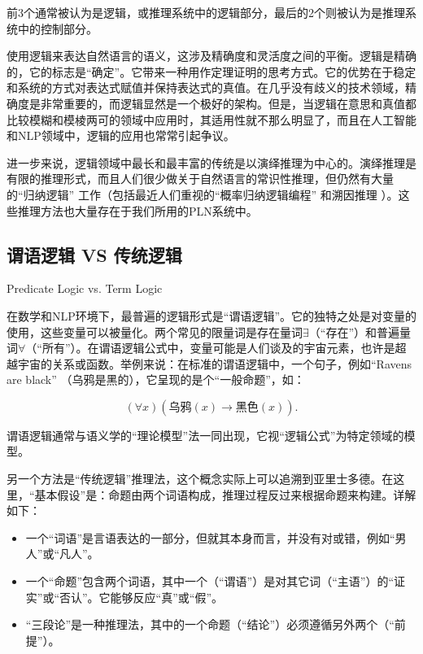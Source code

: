 \noindent 前3个通常被认为是逻辑，或推理系统中的逻辑部分，最后的2个则被认为是推理系统中的控制部分。

使用逻辑来表达自然语言的语义，这涉及精确度和灵活度之间的平衡。逻辑是精确的，它的标志是“确定”。它带来一种用作定理证明的思考方式。它的优势在于稳定和系统的方式对表达式赋值并保持表达式的真值。在几乎没有歧义的技术领域，精确度是非常重要的，而逻辑显然是一个极好的架构。但是，当逻辑在意思和真值都比较模糊和模棱两可的领域中应用时，其适用性就不那么明显了，而且在人工智能和NLP领域中，逻辑的应用也常常引起争议。

进一步来说，逻辑领域中最长和最丰富的传统是以演绎推理为中心的。演绎推理是有限的推理形式，而且人们很少做关于自然语言的常识性推理，但仍然有大量的“归纳逻辑”\cite{Muggleton1994} \cite{Holland1989}工作（包括最近人们重视的“概率归纳逻辑编程” \cite{Riguzzi2014}和溯因推理\cite{Queiroz2005} \cite{Menzies1996}）。这些推理方法也大量存在于我们所用的PLN系统中。


\subsection{谓语逻辑 VS 传统逻辑}{Predicate Logic vs. Term Logic}

在数学和NLP环境下，最普遍的逻辑形式是“谓语逻辑”。它的独特之处是对变量的使用，这些变量可以被量化。两个常见的限量词是存在量词$\exists$（“存在”）和普遍量词$\forall$（“所有”）。在谓语逻辑公式中，变量可能是人们谈及的宇宙元素，也许是超越宇宙的关系或函数。举例来说：在标准的谓语逻辑中，一个句子，例如“Ravens are black” （乌鸦是黑的），它呈现的是个“一般命题”，如：

$$
(\forall x)(乌鸦(x) \rightarrow 黑色(x)).
$$

谓语逻辑通常与语义学的“理论模型”法一同出现，它视“逻辑公式”为特定领域的模型\cite{Muller2009}。


另一个方法是“传统逻辑”推理法，这个概念实际上可以追溯到亚里士多德。在这里，“基本假设”是：命题由两个词语构成，推理过程反过来根据命题来构建。详解如下：

\begin{itemize}
\item 一个“词语”是言语表达的一部分，但就其本身而言，并没有对或错，例如“男人”或“凡人”。
\item 一个“命题”包含两个词语，其中一个（“谓语”）是对其它词（“主语”）的“证实”或“否认”。它能够反应“真”或“假”。
\item “三段论”是一种推理法，其中的一个命题（“结论”）必须遵循另外两个（“前提”）。
\end{itemize}

